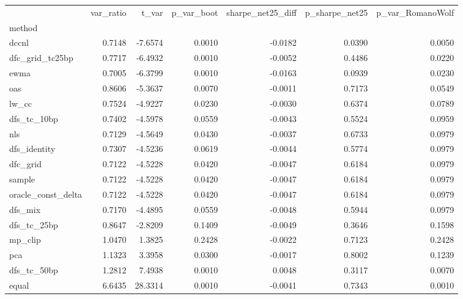 \begin{tabular}{lrrrrrr}
\toprule
 & var_ratio & t_var & p_var_boot & sharpe_net25_diff & p_sharpe_net25 & p_var_RomanoWolf \\
method &  &  &  &  &  &  \\
\midrule
dccnl & 0.7148 & -7.6574 & 0.0010 & -0.0182 & 0.0390 & 0.0050 \\
dfc_grid_tc25bp & 0.7717 & -6.4932 & 0.0010 & -0.0052 & 0.4486 & 0.0220 \\
ewma & 0.7005 & -6.3799 & 0.0010 & -0.0163 & 0.0939 & 0.0230 \\
oas & 0.8606 & -5.3637 & 0.0070 & -0.0011 & 0.7173 & 0.0549 \\
lw_cc & 0.7524 & -4.9227 & 0.0230 & -0.0030 & 0.6374 & 0.0789 \\
dfs_tc_10bp & 0.7402 & -4.5978 & 0.0559 & -0.0043 & 0.5524 & 0.0959 \\
nls & 0.7129 & -4.5649 & 0.0430 & -0.0037 & 0.6733 & 0.0979 \\
dfs_identity & 0.7307 & -4.5236 & 0.0619 & -0.0044 & 0.5774 & 0.0979 \\
dfc_grid & 0.7122 & -4.5228 & 0.0420 & -0.0047 & 0.6184 & 0.0979 \\
sample & 0.7122 & -4.5228 & 0.0420 & -0.0047 & 0.6184 & 0.0979 \\
oracle_const_delta & 0.7122 & -4.5228 & 0.0420 & -0.0047 & 0.6184 & 0.0979 \\
dfs_mix & 0.7170 & -4.4895 & 0.0559 & -0.0048 & 0.5944 & 0.0979 \\
dfs_tc_25bp & 0.8647 & -2.8209 & 0.1409 & -0.0049 & 0.3646 & 0.1598 \\
mp_clip & 1.0470 & 1.3825 & 0.2428 & -0.0022 & 0.7123 & 0.2428 \\
pca & 1.1323 & 3.3958 & 0.0300 & -0.0017 & 0.8002 & 0.1239 \\
dfs_tc_50bp & 1.2812 & 7.4938 & 0.0010 & 0.0048 & 0.3117 & 0.0070 \\
equal & 6.6435 & 28.3314 & 0.0010 & -0.0041 & 0.7343 & 0.0010 \\
\bottomrule
\end{tabular}
